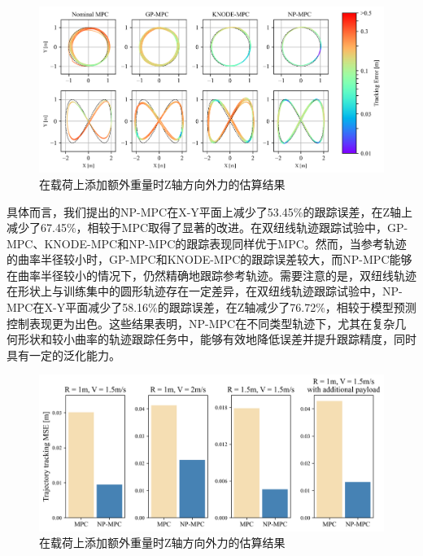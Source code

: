 \documentclass[lang=chs, degree=master, blindreview=false, winfonts=true]{yanputhesis}
\begin{document}
\begin{figure}[hbt!]
	\centering
	\includegraphics[width=38pc]{picture/kk/color.png} 
	\caption{在载荷上添加额外重量时Z轴方向外力的估算结果} 
	\label{color}
\end{figure}
具体而言，我们提出的NP-MPC在X-Y平面上减少了53.45\%的跟踪误差，在Z轴上减少了67.45\%，相较于MPC取得了显著的改进。在双纽线轨迹跟踪试验中，GP-MPC、KNODE-MPC和NP-MPC的跟踪表现同样优于MPC。然而，当参考轨迹的曲率半径较小时，GP-MPC和KNODE-MPC的跟踪误差较大，而NP-MPC能够在曲率半径较小的情况下，仍然精确地跟踪参考轨迹。需要注意的是，双纽线轨迹在形状上与训练集中的圆形轨迹存在一定差异，在双纽线轨迹跟踪试验中，NP-MPC在X-Y平面减少了58.16\%的跟踪误差，在Z轴减少了76.72\%，相较于模型预测控制表现更为出色。这些结果表明，NP-MPC在不同类型轨迹下，尤其在复杂几何形状和较小曲率的轨迹跟踪任务中，能够有效地降低误差并提升跟踪精度，同时具有一定的泛化能力。

\begin{figure}[hbt!]
	\centering
	\includegraphics[width=38pc]{picture/kk/prediction_res.png} 
	\caption{在载荷上添加额外重量时Z轴方向外力的估算结果} 
	\label{prediction_res}
\end{figure}
\end{document}
